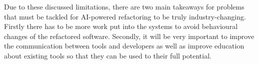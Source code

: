 Due to these discussed limitations, there are two main takeaways for problems that must be tackled for AI-powered refactoring to be truly industry-changing.
Firstly there has to be more work put into the systems to avoid behavioural changes of the refactored software. 
Secondly, it will be very important to improve the communication between tools and developers as well as improve education about existing tools so that they can be used to their full potential.
